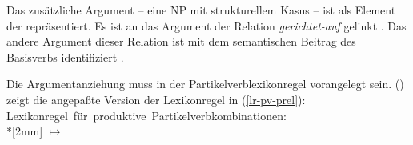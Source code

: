 \noindent
Das zusätzliche Argument -- eine NP mit strukturellem Kasus -- ist als Element der \subjl repräsentiert.
Es ist an das Argument der Relation \emph{gerichtet-auf} gelinkt . Das andere Argument dieser
Relation ist mit dem semantischen Beitrag des Basisverbs identifiziert .

Die Argumentanziehung muss in der Partikelverblexikonregel vorangelegt sein.
() zeigt die angepaßte Version der Lexikonregel in (\ref{lr-pv-prel}):
\eas
\label{lr-pv}%
\mbox{Lexikonregel für produktive Partikelverbkombinationen:}\\*[2mm]
\onems[stem]{
           synsem \ibox{1} \onems{ loc$|$cat \ms{ head & \type{verb} \\ 
                                                  comps & \ibox{2}\\
}
                                 } \\
         }  $\mapsto$ \\
%
%
\zs
{} 

